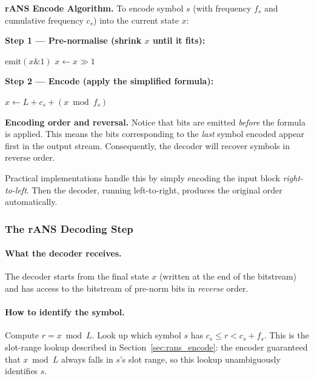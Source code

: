 \begin{definitionbox}
\textbf{rANS Encode Algorithm.}  To encode symbol $s$
(with frequency $f_s$ and cumulative frequency $c_s$)
into the current state $x$:

\medskip
\textbf{Step 1 — Pre-normalise (shrink $x$ until it fits):}
\begin{algorithmic}[1]
    \State $\text{emit}(x \mathrel{\&} 1)$
    \State $x \leftarrow x \gg 1$
\EndWhile
{}
\end{algorithmic}

\medskip
\textbf{Step 2 — Encode (apply the simplified formula):}
\begin{algorithmic}[1]
\State $x \leftarrow L + c_s + (x \bmod f_s)$
       \Comment{new state, guaranteed in $[L, 2L)$}
\end{algorithmic}
\end{definitionbox}

\begin{importantbox}
\textbf{Encoding order and reversal.}
Notice that bits are emitted \emph{before} the formula is
applied.  This means the bits corresponding to the \emph{last}
symbol encoded appear first in the output stream.  Consequently,
the decoder will recover symbols in reverse order.

Practical implementations handle this by simply encoding the
input block \emph{right-to-left}.  Then the decoder, running
left-to-right, produces the original order automatically.
\end{importantbox}


\subsubsection{The rANS Decoding Step}
\label{sec:rans_decode}

\paragraph{What the decoder receives.}
The decoder starts from the final state $x$ (written at the
end of the bitstream) and has access to the bitstream of
pre-norm bits in \emph{reverse} order.

\paragraph{How to identify the symbol.}
Compute $r = x \bmod L$.  Look up which symbol $s$ has
$c_s \le r < c_s + f_s$.  This is the slot-range lookup
described in Section~\ref{sec:rans_encode}: the encoder
guaranteed that $x \bmod L$ always falls in $s$'s slot range,
so this lookup unambiguously identifies $s$.

